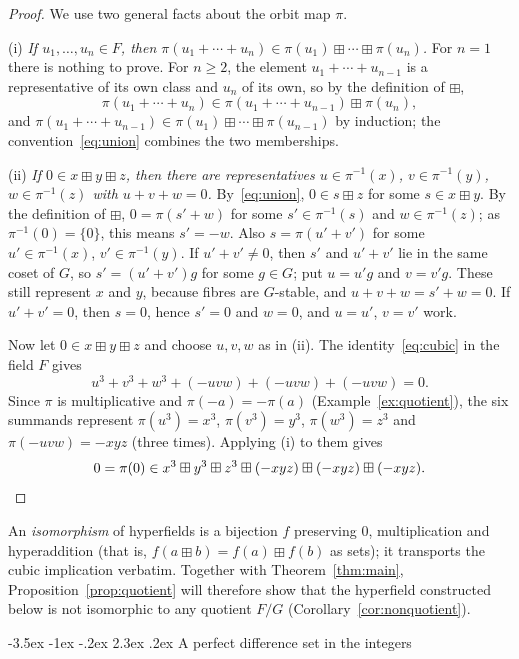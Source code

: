 \documentclass[11pt]{article}
\makeatletter
\renewcommand\section{\@startsection{section}{1}{\z@}
  {-3.5ex \@plus -1ex \@minus -.2ex}
  {2.3ex \@plus.2ex}
  {\normalfont\bfseries}}
\theoremstyle{plain}
\theoremstyle{definition}
\newcommand{\bp}{\boxplus}
\makeatother
\begin{document}
\begin{proof}
We use two general facts about the orbit map $\pi$.

\smallskip\noindent
(i) \emph{If $u_1,\dots,u_n\in F$, then
$\pi(u_1+\cdots+u_n)\in\pi(u_1)\bp\cdots\bp\pi(u_n)$.}
For $n=1$ there is nothing to prove.  For $n\geq2$, the element
$u_1+\cdots+u_{n-1}$ is a representative of its own class and $u_n$ of
its own, so by the definition of $\bp$,
\[
 \pi(u_1+\cdots+u_n)\in\pi(u_1+\cdots+u_{n-1})\bp\pi(u_n),
\]
and $\pi(u_1+\cdots+u_{n-1})\in\pi(u_1)\bp\cdots\bp\pi(u_{n-1})$ by
induction; the convention~\eqref{eq:union} combines the two memberships.

\smallskip\noindent
(ii) \emph{If $0\in x\bp y\bp z$, then there are representatives
$u\in\pi^{-1}(x)$, $v\in\pi^{-1}(y)$, $w\in\pi^{-1}(z)$ with
$u+v+w=0$.}  By~\eqref{eq:union}, $0\in s\bp z$ for some $s\in x\bp y$.
By the definition of $\bp$, $0=\pi(s'+w)$ for some $s'\in\pi^{-1}(s)$
and $w\in\pi^{-1}(z)$; as $\pi^{-1}(0)=\{0\}$, this means $s'=-w$.
Also $s=\pi(u'+v')$ for some $u'\in\pi^{-1}(x)$, $v'\in\pi^{-1}(y)$.
If $u'+v'\neq0$, then $s'$ and $u'+v'$ lie in the same coset of $G$, so
$s'=(u'+v')g$ for some $g\in G$; put $u=u'g$ and $v=v'g$.  These still
represent $x$ and $y$, because fibres are $G$-stable, and
$u+v+w=s'+w=0$.  If $u'+v'=0$, then $s=0$, hence $s'=0$ and $w=0$, and
$u=u'$, $v=v'$ work.

\smallskip
Now let $0\in x\bp y\bp z$ and choose $u,v,w$ as in (ii).  The
identity~\eqref{eq:cubic} in the field $F$ gives
\[
 u^3+v^3+w^3+(-uvw)+(-uvw)+(-uvw)=0.
\]
Since $\pi$ is multiplicative and $\pi(-a)=-\pi(a)$
(Example~\ref{ex:quotient}), the six summands represent
$\pi(u^3)=x^3$, $\pi(v^3)=y^3$, $\pi(w^3)=z^3$ and
$\pi(-uvw)=-xyz$ (three times).  Applying (i) to them gives
\[
 0=\pi(0)\in x^3\bp y^3\bp z^3\bp(-xyz)\bp(-xyz)\bp(-xyz).\qedhere
\]
\end{proof}

An \emph{isomorphism} of hyperfields is a bijection $f$ preserving $0$,
multiplication and hyperaddition (that is, $f(a\bp b)=f(a)\bp f(b)$ as
sets); it transports the cubic implication verbatim.  Together with
Theorem~\ref{thm:main}, Proposition~\ref{prop:quotient} will therefore
show that the hyperfield constructed below is not isomorphic to any
quotient $F/G$ (Corollary~\ref{cor:nonquotient}).

\section{A perfect difference set in the integers}\label{sec:diffset}
\end{document}
